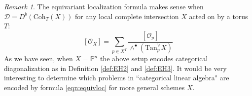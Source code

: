 \documentclass[12pt]{amsart}
\numberwithin{equation}{section}
\theoremstyle{definition}
\theoremstyle{remark}
\newtheorem{remark}[theorem]{Remark}
\newcommand{\PP}{\mathbb{P}}
\newcommand{\cat}{\mathcal{C}}
\renewcommand{\CD}{\mathcal{D}}
\newcommand{\CO}{\mathcal{O}}
\renewcommand{\1}{\mathbf{1}}
\newcommand{\coh}{\mathrm{Coh}}
\newcommand{\loccit}{\emph{loc. cit. }}
\newcommand{\Tan}{\text{Tan}}
\begin{document}

\begin{remark}
\label{rem:what if}
The equivariant localization formula makes sense when $\CD = D^b(\coh_T(X))$ for any local complete intersection $X$ acted on by a torus $T$:
\begin{equation}
\label{eqn:equivloc}
[\CO_X] = \sum_{p \in X^T} \frac {[\CO_p]}{\wedge^\bullet \left( \Tan_p^\vee X \right)} 
\end{equation}
As we have seen, when $X = \PP^n$ the above setup encodes categorical diagonalization as in Definition \ref{def:EH2} and \ref{def:EH3}. It would be very interesting to determine which problems in ``categorical linear algebra" are encoded by formula \eqref{eqn:equivloc} for more general schemes $X$. 

\end{remark}


\end{document}
